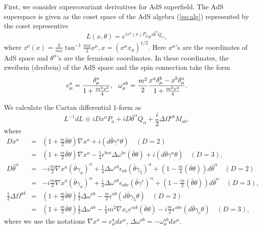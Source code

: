 \documentclass[a4paper,12pt]{article}
\def\btheta{\bar{\theta}}
\def\dfrac#1#2{{\displaystyle\frac{#1}{#2}}}
\def\cfrac#1#2{\dfrac{\mathstrut #1}{#2}}
\begin{document}
First, we consider supercovariant derivatives for AdS superfield.
The AdS superspace is given as the coset space of 
the AdS algebra (\ref{eq:alg}) represented by the coset representive
\begin{equation}
 L(x,\theta) = e^{iz^{\mu}(x)P_{\mu}}e^{i\btheta^{\alpha} Q_{\alpha}},
\end{equation}
where $z^{\mu}(x) = \frac{2}{mx}\tan ^{-1}\frac{mx}{2}{x^{\mu}}, 
x=(x^{\mu}x_{\mu})^{1/2}$.
Here $x^{\mu}$'s are the coordinates of AdS space and
$\theta^{\alpha}$'s are the fermionic coordinates. In these coordinates, the
zweibein (dreibein) of the AdS space and the spin connection take the form
\begin{equation}
 e^{a}_{\mu} =
 \cfrac{\delta^{a}_{\mu}}{1+\frac{m^{2}x^{2}}{4}},\ \ 
 \omega^{ab}_{\mu} = \frac{m^{2}}{2}
   \cfrac{x^{a}\delta^{b}_{\mu}-x^{b}\delta^{a}_{\mu}}
	{1+\frac{m^{2}x^{2}}{4}}.
\end{equation}

We calculate the Cartan differential 1-form as \cite{Z}
\begin{equation}
 L^{-1}dL \equiv iDx^{a}P_{a}
  + iD\btheta^{\alpha}Q_{\alpha}
  + \frac{i}{2}\mathit{\Delta\Omega}^{ab}M_{ab},
\end{equation}
where
\begin{eqnarray}
 Dx^{a} &=& \left(1+\frac{m}{2}\btheta\theta\right)\nabla x^{a}
      + i(d\btheta\gamma^{a}\theta) \quad (D=2)\nonumber \\
	&=& \left(1+\frac{m}{2}\btheta\theta\right)\nabla x^{a}
      - \frac{1}{4}\epsilon^{bca}\mathit{\Delta}\omega^{bc}(\btheta\theta)
      + i(d\btheta\gamma^{a}\theta) \quad (D=3),\nonumber \\
 D\btheta^{\alpha} &=& 
      -i\frac{m}{2}\nabla x^{a}(\btheta\gamma_{a})^{\alpha}
      + \frac{1}{4}\mathit{\Delta}\omega^{ab}\epsilon_{ab}
      (\btheta\gamma_{5})^{\alpha} +
      \left(1-\frac{m}{4}(\btheta\theta)\right)d\btheta^{\alpha} \quad (D=2)
	  \label{ospcartanresult} \\
      &=& 
	 -i\frac{m}{2}\nabla x^{a}(\btheta\gamma_{a})^{\alpha}
          + \frac{i}{4}\mathit{\Delta}\omega^{ab}\epsilon_{abc}
                (\btheta\gamma^{c})^{\alpha} + 
	\left(1-\frac{m}{2}(\btheta\theta)\right)d\btheta^{\alpha} \quad (D=3),
	\nonumber \\
 \frac{1}{2}\mathit{\Delta \Omega}^{ab}
	 &=& 
   \left(1+\frac{m}{2}\btheta\theta\right)\frac{1}{2}\mathit{\Delta}\omega^{ab}
     - \frac{m}{2}\epsilon^{ab}(d\btheta\gamma_{5}\theta) \quad (D=2)
	 \nonumber \\
	&=&
   \left(1+\frac{m}{2}\btheta\theta\right)\frac{1}{2}\mathit{\Delta}\omega^{ab}
     - \frac{1}{4}m^{2}\nabla x_{c}\epsilon^{cab}(\btheta\theta)
     - i\frac{m}{2}\epsilon^{abc}(d\btheta\gamma_{c}\theta) \quad (D=3), 
	\nonumber
\end{eqnarray}
where we use the notations $\nabla x^{a} =
e^{a}_{\mu}dx^{\mu}$,
$\mathit{\Delta}\omega^{ab} = - \omega^{ab}_{\mu}dx^{\mu}$.
\end{document}
